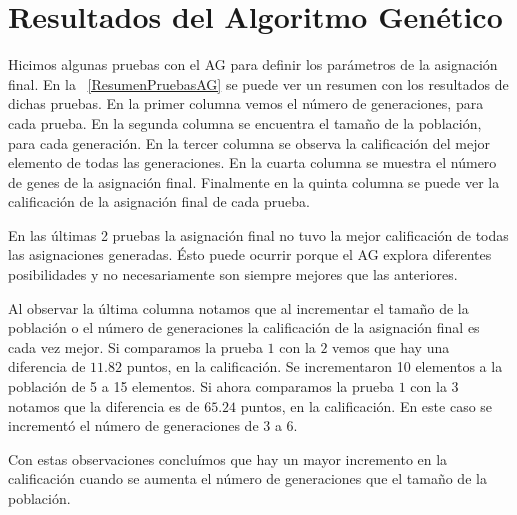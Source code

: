 \section{Resultados del Algoritmo Genético}

Hicimos algunas pruebas con el AG para definir los parámetros de la asignación final. En la \tablename{~\ref{ResumenPruebasAG}} se puede ver un resumen con los resultados de dichas pruebas. En la primer columna vemos el número de generaciones, para cada prueba. En la segunda columna se encuentra el tamaño de la población, para cada generación. En la tercer columna se observa la calificación del mejor elemento de todas las generaciones. En la cuarta columna se muestra el número de genes de la asignación final. Finalmente en la quinta columna se puede ver la calificación de la asignación final de cada prueba.

En las últimas 2 pruebas la asignación final no tuvo la mejor calificación de todas las asignaciones generadas. Ésto puede ocurrir porque el AG explora diferentes posibilidades y no necesariamente son siempre mejores que las anteriores.

Al observar la última columna notamos que al incrementar el tamaño de la población o el número de generaciones la calificación de la asignación final es cada vez mejor. Si comparamos la prueba $1$ con la $2$ vemos que hay una diferencia de $11.82$ puntos, en la calificación. Se incrementaron 10 elementos a la población de 5 a 15 elementos. Si ahora comparamos la prueba $1$ con la $3$ notamos que la diferencia es de $65.24$ puntos, en la calificación. En este caso se incrementó el número de generaciones de 3 a 6.

Con estas observaciones concluímos que hay un mayor incremento en la calificación cuando se aumenta el número de generaciones que el tamaño de la población.

